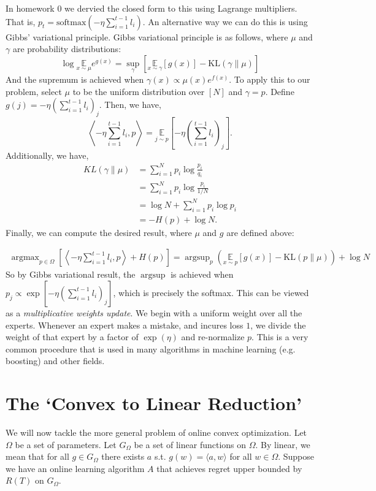 \documentclass[11pt]{article}
\newcommand{\argmax}{\mathop{\text{argmax}}}
\newcommand{\argsup}{\mathop{\text{argsup}}}
\begin{document}
In homework 0 we dervied the closed form to this using Lagrange multipliers. That is, $p_t = \mbox{softmax}(-\eta \sum_{i=1}^{t-1} l_i)$. An alternative way we can do this is using Gibbs' variational principle. Gibbs variational principle is as follows, where $\mu$ and $\gamma$ are probability distributions:
\[ 
\log{\underset{x \sim \mu}{\mathbb{E}}}e^{g(x)} = \sup_{\gamma}\left[\underset{x \sim \gamma}{\mathbb{E}}[g(x)] - \mbox{KL}(\gamma \| \mu)\right] 
\]
And the supremum is achieved when $\gamma(x) \propto \mu(x) e^{f(x)}$. To apply this to our problem, select $\mu$ to be the uniform distribution over $[N]$ and $\gamma = p$. Define $g(j) = -\eta (\sum_{i=1}^{t-1}  l_i)_j$. Then, we have,
\[ 
\left\langle -\eta\sum_{i=1}^{t-1}  l_i, p\right\rangle = \underset{j \sim p}{\mathbb{E}} \left[-\eta(\sum_{i=1}^{t-1}  l_i)_j\right].
\]
Additionally, we have,
\begin{align*}
KL(\gamma\|\mu) &= \sum_{i=1}^N p_i \log{\frac{p_i}{q_i}} \\
&= \sum_{i=1}^N p_i \log{\frac{p_i}{1/N}} \\
&= \log{N} + \sum_{i=1}^N p_i \log{p_i} \\
&= -H(p) + \log{N}.
\end{align*}
Finally, we can compute the desired result, where $\mu$ and $g$ are defined above:

\begin{align*}
\argmax_{p \in \Omega}\left[\left\langle -\eta\sum_{i=1}^{t-1}  l_i, p\right\rangle +  H(p)\right] = \argsup_{p}\left(\underset{x \sim p}{\mathbb{E}}[g(x)] - \mbox{KL}(p\|\mu)\right) + \log{N}
\end{align*}
So by Gibbs variational result, the $\argsup$ is achieved when $p_j \propto \exp[-\eta(\sum_{i=1}^{t-1}  l_i)_j]$, which is precisely the softmax. This can be viewed as a \emph{multiplicative weights update}. We begin with a uniform weight over all the experts. Whenever an expert makes a mistake, and incures loss $1$, we divide the weight of that expert by a factor of $\exp({\eta})$ and re-normalize \(p\). This is a very common procedure that is used in many algorithms in machine learning (e.g. boosting) and other fields.

\section{The `Convex to Linear Reduction'}

We will now tackle the more general problem of online convex optimization. Let $\Omega$ be a set of parameters. Let $G_{\Omega}$ be a set of linear functions on $\Omega$. By linear, we mean that for all $g \in G_{\Omega}$ there exists $a$ s.t. $g(w) = \langle a, w \rangle$ for all $w \in \Omega$. Suppose we have an online learning algorithm $A$ that achieves regret upper bounded by $R(T)$ on $G_{\Omega}$.
\end{document}
